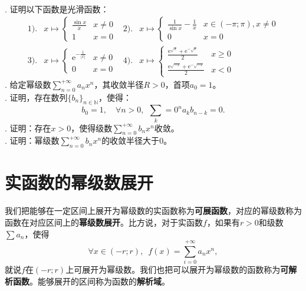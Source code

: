 \documentclass[12pt,UTF8,fontset=none]{ctexbook}
\begin{document}
\begin{appendix}
\begin{xt}
    \mbox{} \\
    . 证明以下函数是光滑函数：
    \begin{align*}
        1).& 
        x \mapsto \begin{cases}
            \frac{\sin{x}}{x} & x\neq 0 \\
            1 & x = 0 
        \end{cases}
        &2).&
        x \mapsto \begin{cases}
            \frac{1}{\sin{x}} - \frac{1}{x} & x\in (-\pi;\pi), x\neq 0 \\
            0 & x = 0 
        \end{cases} \\
        3).& 
        x \mapsto \begin{cases}
            \mathrm{e}^{-\frac{1}{|x|}} & x\neq 0 \\
            0 & x = 0 
        \end{cases}
        &4).&
        x \mapsto \begin{cases}
            \frac{\mathrm{e}^{\sqrt{x}} + \mathrm{e}^{-\sqrt{x}}}{2} & x\geqslant 0 \\
            \frac{\mathrm{e}^{\sqrt{-x}} + \mathrm{e}^{-\sqrt{-x}}}{2} & x < 0 
        \end{cases}
    \end{align*}
    . 给定幂级数$\sum_{n=0}^{+\infty} a_n x^n$，其收敛半径$R>0$，首项$a_0=1$。\\
    . 证明，存在数列$\{b_n\}_{n\in\mathbb{N}}$，使得：
    $$
    b_0 = 1, \quad \forall n > 0, \;\, \sum_k=0^n a_k b_{n-k} = 0.
    $$
    . 证明：存在$x>0$，使得级数$\sum_{n=0}^{+\infty} b_n x^n$收敛。\\
    . 证明：幂级数$\sum_{n=0}^{+\infty} b_n x^n$的收敛半径大于$0$。
\end{xt}

\section{实函数的幂级数展开}

我们把能够在一定区间上展开为幂级数的实函数称为\textbf{可展函数}，对应的幂级数称为函数在对应区间上的\textbf{幂级数展开}。比方说，对于实函数$f$，如果有$r>0$和级数$\sum a_n$，使得
$$\forall x\in (-r;r),\,\,\, f(x) = \sum_{i=0}^{+\infty} a_n x^n,$$
就说$f$在$(-r;r)$上可展开为幂级数。我们也把可以展开为幂级数的函数称为\textbf{可解析函数}。能够展开的区间称为函数的\textbf{解析域}。


\end{appendix}
\end{document}
